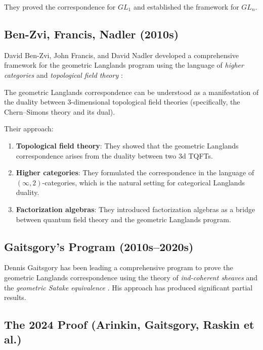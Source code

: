 They proved the correspondence for $GL_1$ and established the framework for $GL_n$.

\subsection{Ben-Zvi, Francis, Nadler (2010s)}

David Ben-Zvi, John Francis, and David Nadler developed a comprehensive framework for the geometric Langlands program using the language of \emph{higher categories} and \emph{topological field theory} \cite{benzvi2014}:

\begin{theorem}
The geometric Langlands correspondence can be understood as a manifestation of the duality between 3-dimensional topological field theories (specifically, the Chern--Simons theory and its dual).
\end{theorem}

Their approach:

\begin{enumerate}
\item \textbf{Topological field theory}: They showed that the geometric Langlands correspondence arises from the duality between two 3d TQFTs.
\item \textbf{Higher categories}: They formulated the correspondence in the language of $(\infty, 2)$-categories, which is the natural setting for categorical Langlands duality.
\item \textbf{Factorization algebras}: They introduced factorization algebras as a bridge between quantum field theory and the geometric Langlands program.
\end{enumerate}

\subsection{Gaitsgory's Program (2010s--2020s)}

Dennis Gaitsgory has been leading a comprehensive program to prove the geometric Langlands correspondence using the theory of \emph{ind-coherent sheaves} and the \emph{geometric Satake equivalence} \cite{gaitsgory2009}. His approach has produced significant partial results.

\subsection{The 2024 Proof (Arinkin, Gaitsgory, Raskin et al.)}

